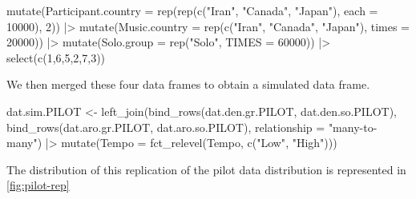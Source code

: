 \documentclass[
  bookmarksnumbered]{article}
\newenvironment{Shaded}{\begin{snugshade}}{\end{snugshade}}
\newcommand{\AttributeTok}[1]{\textcolor[rgb]{0.80,0.80,0.80}{#1}}
\newcommand{\DecValTok}[1]{\textcolor[rgb]{0.86,0.86,0.80}{#1}}
\newcommand{\FunctionTok}[1]{\textcolor[rgb]{0.94,0.94,0.56}{#1}}
\newcommand{\NormalTok}[1]{\textcolor[rgb]{0.80,0.80,0.80}{#1}}
\newcommand{\OtherTok}[1]{\textcolor[rgb]{0.94,0.94,0.56}{#1}}
\newcommand{\SpecialCharTok}[1]{\textcolor[rgb]{0.86,0.64,0.64}{#1}}
\newcommand{\StringTok}[1]{\textcolor[rgb]{0.80,0.58,0.58}{#1}}
\begin{document}
\begin{Shaded}
\begin{Highlighting}[]
  \FunctionTok{mutate}\NormalTok{(}\AttributeTok{Participant.country =} \FunctionTok{rep}\NormalTok{(}\FunctionTok{rep}\NormalTok{(}\FunctionTok{c}\NormalTok{(}\StringTok{"Iran"}\NormalTok{, }\StringTok{"Canada"}\NormalTok{, }\StringTok{"Japan"}\NormalTok{), }\AttributeTok{each =} \DecValTok{10000}\NormalTok{), }\DecValTok{2}\NormalTok{)) }\SpecialCharTok{|\textgreater{}}
  \FunctionTok{mutate}\NormalTok{(}\AttributeTok{Music.country =} \FunctionTok{rep}\NormalTok{(}\FunctionTok{c}\NormalTok{(}\StringTok{"Iran"}\NormalTok{, }\StringTok{"Canada"}\NormalTok{, }\StringTok{"Japan"}\NormalTok{), }\AttributeTok{times =} \DecValTok{20000}\NormalTok{)) }\SpecialCharTok{|\textgreater{}}
  \FunctionTok{mutate}\NormalTok{(}\AttributeTok{Solo.group =} \FunctionTok{rep}\NormalTok{(}\StringTok{"Solo"}\NormalTok{, }\AttributeTok{TIMES =} \DecValTok{60000}\NormalTok{)) }\SpecialCharTok{|\textgreater{}}
  \FunctionTok{select}\NormalTok{(}\FunctionTok{c}\NormalTok{(}\DecValTok{1}\NormalTok{,}\DecValTok{6}\NormalTok{,}\DecValTok{5}\NormalTok{,}\DecValTok{2}\NormalTok{,}\DecValTok{7}\NormalTok{,}\DecValTok{3}\NormalTok{))}
\end{Highlighting}
\end{Shaded}

We then merged these four data frames to obtain a simulated data frame.

\begin{Shaded}
\begin{Highlighting}[]
\NormalTok{dat.sim.PILOT }\OtherTok{\textless{}{-}} \FunctionTok{left\_join}\NormalTok{(}\FunctionTok{bind\_rows}\NormalTok{(dat.den.gr.PILOT, dat.den.so.PILOT),}
                           \FunctionTok{bind\_rows}\NormalTok{(dat.aro.gr.PILOT, dat.aro.so.PILOT),}
                           \AttributeTok{relationship =} \StringTok{"many{-}to{-}many"}\NormalTok{) }\SpecialCharTok{|\textgreater{}} 
  \FunctionTok{mutate}\NormalTok{(}\AttributeTok{Tempo =} \FunctionTok{fct\_relevel}\NormalTok{(Tempo, }\FunctionTok{c}\NormalTok{(}\StringTok{"Low"}\NormalTok{, }\StringTok{"High"}\NormalTok{)))}
\end{Highlighting}
\end{Shaded}

The distribution of this replication of the pilot data distribution is represented in \ref{fig:pilot-rep}
\end{document}
